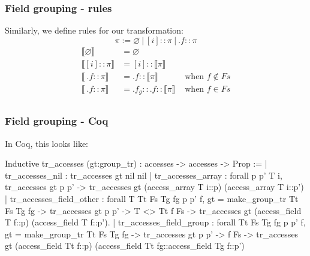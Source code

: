 \begin{frame}[fragile]
\frametitle{Field grouping - rules}

Similarly, we define rules for our transformation:
\[
	\pi := \varnothing \: | \: [i]::\pi \: | \: .f::\pi
\] 
\begin{align*}
	\llbracket \varnothing \rrbracket &= \varnothing & \\
	\llbracket [i]::\pi \rrbracket &= [i]:: \llbracket \pi \rrbracket & \\
	\llbracket \: .f::\pi \rrbracket &= .f:: \llbracket \pi \rrbracket  & \text{ when } f \notin Fs  \\
	\llbracket \: .f::\pi \rrbracket &= .f_g::.f:: \llbracket \pi \rrbracket & \text{ when } f \in Fs \\
\end{align*}

\end{frame}




\begin{frame}[fragile]
\frametitle{Field grouping - Coq}


\bigskip

In Coq, this looks like:

\begin{coqs}
Inductive tr_accesses (gt:group_tr) : accesses -> accesses -> Prop :=
  | tr_accesses_nil :
      tr_accesses gt nil nil
  | tr_accesses_array : forall p p' T i,
      tr_accesses gt p p' ->
      tr_accesses gt (access_array T i::p) (access_array T i::p')
  | tr_accesses_field_other : forall T Tt Fs Tg fg p p' f,
      gt = make_group_tr Tt Fs Tg fg ->
      tr_accesses gt p p' ->
      T <> Tt \/ f \notin Fs ->
      tr_accesses gt (access_field T f::p) (access_field T f::p').  
  | tr_accesses_field_group : forall Tt Fs Tg fg p p' f,
      gt = make_group_tr Tt Fs Tg fg ->
      tr_accesses gt p p' ->
      f \in Fs ->
      tr_accesses gt (access_field Tt f::p) (access_field Tt fg::access_field Tg f::p')
\end{coqs}

\end{frame}


